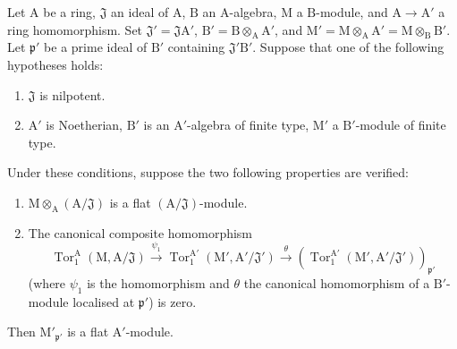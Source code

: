 \begin{lemma}[11.2.5]
\label{IV.11.2.5}
Let $\mathrm{A}$ be a ring, $\mathfrak{J}$ an ideal of $\mathrm{A}$,
$\mathrm{B}$ an $\mathrm{A}$-algebra, $\mathrm{M}$ a
$\mathrm{B}$-module, and $\mathrm{A}\to\mathrm{A}'$ a ring
homomorphism. Set
$\mathfrak{J}'=\mathfrak{J}\mathrm{A}'$,
$\mathrm{B}'=\mathrm{B}\otimes_\mathrm{A}\mathrm{A}'$, and
$\mathrm{M}'=\mathrm{M}\otimes_\mathrm{A}\mathrm{A}'
=\mathrm{M}\otimes_\mathrm{B}\mathrm{B}'$. Let
$\mathfrak{p}'$ be a prime ideal of $\mathrm{B}'$ containing
$\mathfrak{J}'\mathrm{B}'$. Suppose that one of the following
hypotheses holds:
\begin{enumerate}[label=\emph{\alph*)}]
  \item $\mathfrak{J}$ is nilpotent.
  \item $\mathrm{A}'$ is Noetherian, $\mathrm{B}'$ is an $\mathrm{A}'$-algebra of finite type, $\mathrm{M}'$ a $\mathrm{B}'$-module of finite type.
\end{enumerate}
Under these conditions, suppose the two following properties are verified:
\begin{enumerate}[label=\emph{(\roman*)}]
  \item $\mathrm{M}\otimes_\mathrm{A}(\mathrm{A}/\mathfrak{J})$ is a flat $(\mathrm{A}/\mathfrak{J})$-module.
  \item The canonical composite homomorphism
\[
  \operatorname{Tor}_1^\mathrm{A}(\mathrm{M},\mathrm{A}/\mathfrak{J})\xrightarrow{\psi_1}\operatorname{Tor}_1^{\mathrm{A}'}(\mathrm{M}',\mathrm{A}'/\mathfrak{J}')\xrightarrow{\theta}(\operatorname{Tor}_1^{\mathrm{A}'}(\mathrm{M}',\mathrm{A}'/\mathfrak{J}'))_{\mathfrak{p}'}
\]
(where $\psi_1$ is the homomorphism  and $\theta$ the canonical homomorphism of a $\mathrm{B}'$-module localised at $\mathfrak{p}'$) is zero.
\end{enumerate}

Then $\mathrm{M}'_{\mathfrak{p}'}$ is a flat $\mathrm{A}'$-module.
\end{lemma}

